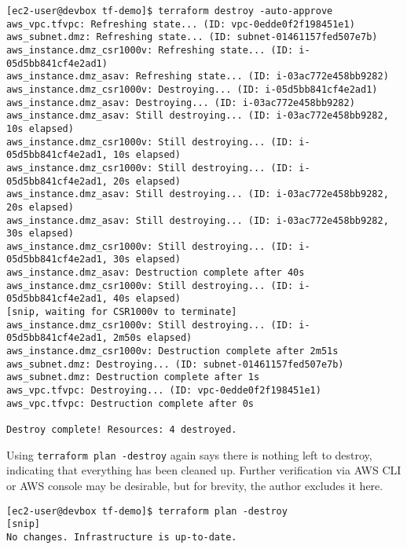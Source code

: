 \begin{verbatim}
[ec2-user@devbox tf-demo]$ terraform destroy -auto-approve
aws_vpc.tfvpc: Refreshing state... (ID: vpc-0edde0f2f198451e1)
aws_subnet.dmz: Refreshing state... (ID: subnet-01461157fed507e7b)
aws_instance.dmz_csr1000v: Refreshing state... (ID: i-05d5bb841cf4e2ad1)
aws_instance.dmz_asav: Refreshing state... (ID: i-03ac772e458bb9282)
aws_instance.dmz_csr1000v: Destroying... (ID: i-05d5bb841cf4e2ad1)
aws_instance.dmz_asav: Destroying... (ID: i-03ac772e458bb9282)
aws_instance.dmz_asav: Still destroying... (ID: i-03ac772e458bb9282, 10s elapsed)
aws_instance.dmz_csr1000v: Still destroying... (ID: i-05d5bb841cf4e2ad1, 10s elapsed)
aws_instance.dmz_csr1000v: Still destroying... (ID: i-05d5bb841cf4e2ad1, 20s elapsed)
aws_instance.dmz_asav: Still destroying... (ID: i-03ac772e458bb9282, 20s elapsed)
aws_instance.dmz_asav: Still destroying... (ID: i-03ac772e458bb9282, 30s elapsed)
aws_instance.dmz_csr1000v: Still destroying... (ID: i-05d5bb841cf4e2ad1, 30s elapsed)
aws_instance.dmz_asav: Destruction complete after 40s
aws_instance.dmz_csr1000v: Still destroying... (ID: i-05d5bb841cf4e2ad1, 40s elapsed)
[snip, waiting for CSR1000v to terminate]
aws_instance.dmz_csr1000v: Still destroying... (ID: i-05d5bb841cf4e2ad1, 2m50s elapsed)
aws_instance.dmz_csr1000v: Destruction complete after 2m51s
aws_subnet.dmz: Destroying... (ID: subnet-01461157fed507e7b)
aws_subnet.dmz: Destruction complete after 1s
aws_vpc.tfvpc: Destroying... (ID: vpc-0edde0f2f198451e1)
aws_vpc.tfvpc: Destruction complete after 0s

Destroy complete! Resources: 4 destroyed.
\end{verbatim}

Using \verb|terraform plan -destroy| again says there is nothing left to destroy,
indicating that everything has been cleaned up. Further verification via AWS
CLI or AWS console may be desirable, but for brevity, the author excludes it here.

\begin{verbatim}
[ec2-user@devbox tf-demo]$ terraform plan -destroy
[snip]
No changes. Infrastructure is up-to-date.
\end{verbatim}
